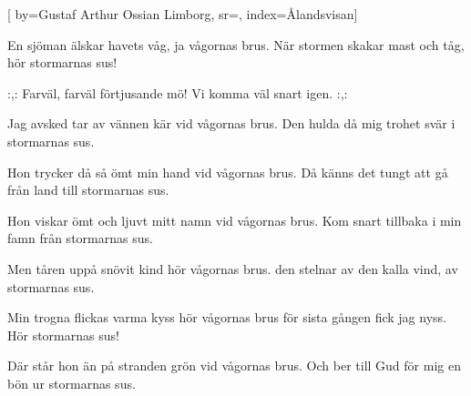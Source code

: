 


[ 	%
	by={Gustaf Arthur Ossian Limborg},	%
	sr={},		%
	index={Ålandsvisan}]		%
	
\beginverse*		%
En sjöman älskar havets våg, 
ja vågornas brus.
När stormen skakar mast och tåg, 
hör stormarnas sus!
\endverse			%

\beginchorus
:,: Farväl, farväl förtjusande mö! 
Vi komma väl snart igen. :,:
\endchorus

\beginverse*		%
Jag avsked tar av vännen kär 
vid vågornas brus.
Den hulda då mig trohet svär
i stormarnas sus.
\endverse			%

\beginverse*		%
Hon trycker då så ömt min hand 
vid vågornas brus.
Då känns det tungt att gå från land 
till stormarnas sus.
\endverse			%

\beginverse*		%
Hon viskar ömt och ljuvt mitt namn 
vid vågornas brus.
Kom snart tillbaka i min famn 
från stormarnas sus.
\endverse			%

\beginverse*		%
Men tåren uppå snövit kind  
hör vågornas brus.
den stelnar av den kalla vind, 
av stormarnas sus.
\endverse			%

\beginverse*		%
Min trogna flickas varma kyss 
hör vågornas brus 
för sista gången fick jag nyss. 
Hör stormarnas sus!
\endverse			%

\beginverse*		%
Där står hon än på stranden grön 
vid vågornas brus.
Och ber till Gud för mig en bön 
ur stormarnas sus.
\endverse			%
\endsong			%
